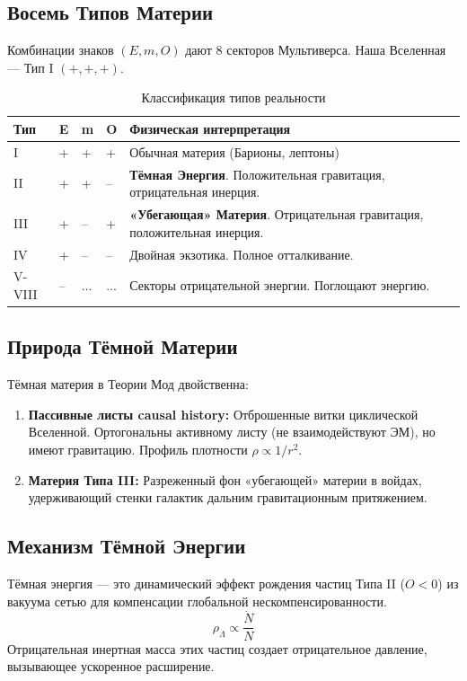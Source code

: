 \documentclass[12pt,a4paper]{article}
\begin{document}
\subsection{Восемь Типов Материи}
Комбинации знаков $(E, m, O)$ дают 8 секторов Мультиверса. Наша Вселенная — Тип I $(+,+,+)$.

\begin{table}[h]
\centering
\caption{Классификация типов реальности}
\begin{tabular}{@{}lllll@{}}
\toprule
Тип & E & m & O & Физическая интерпретация \\ \midrule
I   & + & + & + & Обычная материя (Барионы, лептоны) \\
II  & + & + & -- & \textbf{Тёмная Энергия}. Положительная гравитация, отрицательная инерция. \\
III & + & -- & + & \textbf{«Убегающая» Материя}. Отрицательная гравитация, положительная инерция. \\
IV  & + & -- & -- & Двойная экзотика. Полное отталкивание. \\
V-VIII & -- & ... & ... & Секторы отрицательной энергии. Поглощают энергию. \\ \bottomrule
\end{tabular}
\end{table}

\subsection{Природа Тёмной Материи}
Тёмная материя в Теории Мод двойственна:
\begin{enumerate}
    \item \textbf{Пассивные листы causal history:} Отброшенные витки циклической Вселенной. Ортогональны активному листу (не взаимодействуют ЭМ), но имеют гравитацию. Профиль плотности $\rho \propto 1/r^2$.
    \item \textbf{Материя Типа III:} Разреженный фон «убегающей» материи в войдах, удерживающий стенки галактик дальним гравитационным притяжением.
\end{enumerate}

\subsection{Механизм Тёмной Энергии}
Тёмная энергия — это динамический эффект рождения частиц Типа II ($O < 0$) из вакуума сетью для компенсации глобальной нескомпенсированности.
\begin{equation}
    \rho_\Lambda \propto \frac{\dot{N}}{N}
\end{equation}
Отрицательная инертная масса этих частиц создает отрицательное давление, вызывающее ускоренное расширение.
\end{document}
